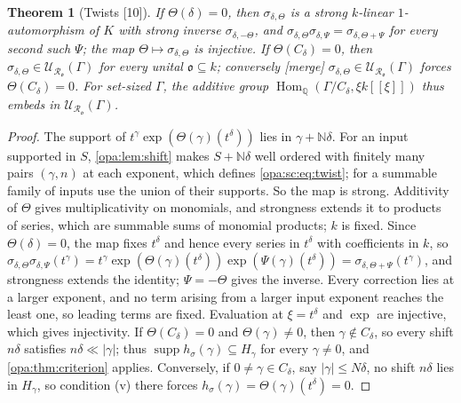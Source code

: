 \documentclass[11pt,oneside]{article}
\numberwithin{equation}{section}
\newtheorem{theorem}{Theorem}[section]
\theoremstyle{definition}
\theoremstyle{remark}
\newcommand{\Q}{\mathbb Q}
\newcommand{\N}{\mathbb N}
\newcommand{\oo}{\mathfrak o}
\newcommand{\Ro}{\mathcal R_{\oo}}
\newcommand{\UU}{\mathcal U}
\newcommand{\Hom}{\operatorname{Hom}}
\newcommand{\supp}{\operatorname{supp}}
\newcommand{\bb}{\mathbin{\ll}}
\newcommand{\src}[1]{\textup{\textsf{\small[#1]}}}
\newcommand{\mergetag}{\textup{\textsf{\small[merge]}}}
\begin{document}
\begin{theorem}[Twists \src{10}]\label{opa:sc:thm:twists}
If $\Theta(\delta)=0$, then $\sigma_{\delta,\Theta}$ is a strong $k$-linear
$1$-automorphism of $K$ with strong inverse $\sigma_{\delta,-\Theta}$, and
$\sigma_{\delta,\Theta}\sigma_{\delta,\Psi}=\sigma_{\delta,\Theta+\Psi}$ for every second
such $\Psi$; the map $\Theta\mapsto\sigma_{\delta,\Theta}$ is injective. If
$\Theta(C_\delta)=0$, then $\sigma_{\delta,\Theta}\in\UU_{\Ro}(\Gamma)$ for every unital
$\oo\subseteq k$; conversely \mergetag{} $\sigma_{\delta,\Theta}\in\UU_{\Ro}(\Gamma)$
forces $\Theta(C_\delta)=0$. For set-sized $\Gamma$, the additive group
$\Hom_\Q(\Gamma/C_\delta,\xi k[[\xi]])$ thus embeds in $\UU_{\Ro}(\Gamma)$.
\end{theorem}
\begin{proof}
The support of $t^\gamma\exp(\Theta(\gamma)(t^\delta))$ lies in $\gamma+\N\delta$. For an
input supported in $S$, \cref{opa:lem:shift} makes $S+\N\delta$ well ordered with
finitely many pairs $(\gamma,n)$ at each exponent, which defines
\eqref{opa:sc:eq:twist}; for a summable family of inputs use the union of their
supports. So the map is strong. Additivity of $\Theta$ gives multiplicativity on
monomials, and strongness extends it to products of series, which are summable
sums of monomial products; $k$ is fixed. Since $\Theta(\delta)=0$, the map fixes
$t^\delta$ and hence every series in $t^\delta$ with coefficients in $k$, so
$\sigma_{\delta,\Theta}\sigma_{\delta,\Psi}(t^\gamma)=t^\gamma\exp(\Theta(\gamma)(t^\delta))
\exp(\Psi(\gamma)(t^\delta))=\sigma_{\delta,\Theta+\Psi}(t^\gamma)$, and strongness extends
the identity; $\Psi=-\Theta$ gives the inverse. Every correction lies at a larger
exponent, and no term arising from a larger input exponent reaches the least
one, so leading terms are fixed. Evaluation at $\xi=t^\delta$ and $\exp$ are
injective, which gives injectivity. If $\Theta(C_\delta)=0$ and $\Theta(\gamma)\ne0$,
then $\gamma\notin C_\delta$, so every shift $n\delta$ satisfies $n\delta\bb|\gamma|$; thus
$\supp h_\sigma(\gamma)\subseteq H_\gamma$ for every $\gamma\ne0$, and
\cref{opa:thm:criterion} applies. Conversely, if $0\ne\gamma\in C_\delta$, say
$|\gamma|\le N\delta$, no shift $n\delta$ lies in $H_\gamma$, so condition (v) there
forces $h_\sigma(\gamma)=\Theta(\gamma)(t^\delta)=0$.
\end{proof}
\end{document}

